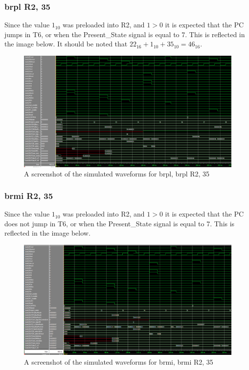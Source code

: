 \documentclass{article}
\begin{document}
        \subsubsection{brpl R2, 35}
            Since the value $1_{10}$ was preloaded into R2, and $1 > 0$ it is expected that the PC jumps in T6, or when the Present\_State signal is equal to 7. This is reflected in the image below. It should be noted that $22_{16} + 1_{10} + 35_{10} = 46_{16}$. 
        
                \begin{figure}[h!]
                    \begin{center}
                        \includegraphics[width=15cm]{brpl_wave.png}
                        \caption{A screenshot of the simulated waveforms for brpl, brpl R2, 35}
                    \end{center}
                \end{figure}

        \subsubsection{brmi R2, 35}
            Since the value $1_{10}$ was preloaded into R2, and $1 > 0$ it is expected that the PC does not jump in T6, or when the Present\_State signal is equal to 7. This is reflected in the image below.
        
                \begin{figure}[h!]
                    \begin{center}
                        \includegraphics[width=15cm]{brmi_wave.png}
                        \caption{A screenshot of the simulated waveforms for brmi, brmi R2, 35}
                    \end{center}
                \end{figure}
\end{document}
